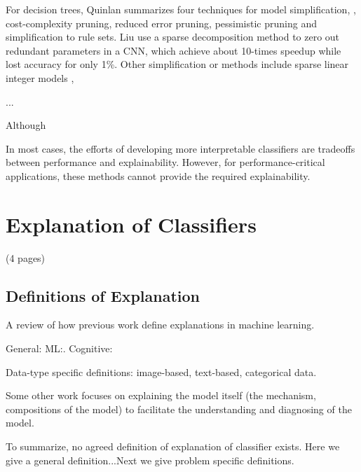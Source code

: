 
For decision trees, Quinlan summarizes four techniques for model simplification\cite{quinlan1987simplifying}, \ie, cost-complexity pruning, reduced error pruning, pessimistic pruning and simplification to rule sets. Liu \etal \cite{liu2015sparsecnn} use a sparse decomposition method to zero out redundant parameters in a CNN, which achieve about 10-times speedup while lost accuracy for only 1\%. Other simplification or methods include sparse linear integer models \cite{ustun2016supersparse}, 

...

Although 

In most cases, the efforts of developing more interpretable classifiers are tradeoffs between performance and explainability. However, for performance-critical applications,  these methods cannot provide the required explainability.


\section{Explanation of Classifiers}
(4 pages)

\subsection{Definitions of Explanation}

A review of how previous work define explanations in machine learning.

General: ML:\cite{doshi-velez2017interpretableml}. Cognitive:\cite{lombrozo2006explanation}

Data-type specific definitions: image-based, text-based, categorical data.

Some other work focuses on explaining the model itself (the mechanism, compositions of the model) to facilitate the understanding and diagnosing of the model.

To summarize, no agreed definition of explanation of classifier exists. Here we give a general definition...Next we give problem specific definitions.

